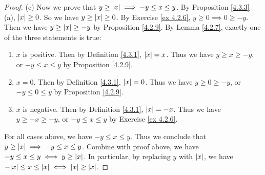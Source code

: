 \begin{proof}{(c)}
    Now we prove that \(y \geq \abs*{x} \implies -y \leq x \leq y\).
    By Proposition \ref{4.3.3} (a), \(\abs*{x} \geq 0\).
    So we have \(y \geq \abs*{x} \geq 0\).
    By Exercise \ref{ex 4.2.6}, \(y \geq 0 \implies 0 \geq -y\).
    Then we have \(y \geq \abs*{x} \geq -y\) by Proposition \ref{4.2.9}.
    By Lemma \ref{4.2.7}, exactly one of the three statements is true:
    \begin{enumerate}
        \item \(x\) is positive.
              Then by Definition \ref{4.3.1}, \(\abs*{x} = x\).
              Thus we have \(y \geq x \geq -y\), or \(-y \leq x \leq y\) by Proposition \ref{4.2.9}.
        \item \(x = 0\).
              Then by Definition \ref{4.3.1}, \(\abs*{x} = 0\).
              Thus we have \(y \geq 0 \geq -y\), or \(-y \leq 0 \leq y\) by Proposition \ref{4.2.9}.
        \item \(x\) is negative.
              Then by Definition \ref{4.3.1}, \(\abs*{x} = -x\).
              Thus we have \(y \geq -x \geq -y\), or \(-y \leq x \leq y\) by Exercise \ref{ex 4.2.6}.
    \end{enumerate}
    For all cases above, we have \(-y \leq x \leq y\).
    Thus we conclude that \(y \geq \abs*{x} \implies -y \leq x \leq y\).
    Combine with proof above, we have \(-y \leq x \leq y \iff y \geq \abs*{x}\).
    In particular, by replacing \(y\) with \(\abs*{x}\), we have \(-\abs*{x} \leq x \leq \abs*{x} \iff \abs*{x} \geq \abs*{x}\).
\end{proof}

